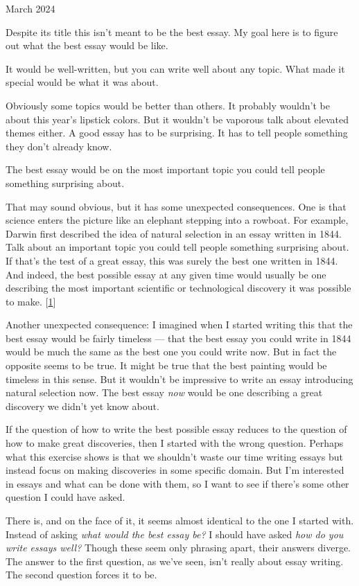 March 2024

Despite its title this isn't meant to be the best essay. My goal here is
to figure out what the best essay would be like.

It would be well-written, but you can write well about any topic. What
made it special would be what it was about.

Obviously some topics would be better than others. It probably wouldn't
be about this year's lipstick colors. But it wouldn't be vaporous talk
about elevated themes either. A good essay has to be surprising. It has
to tell people something they don't already know.

The best essay would be on the most important topic you could tell
people something surprising about.

That may sound obvious, but it has some unexpected consequences. One is
that science enters the picture like an elephant stepping into a
rowboat. For example, Darwin first described the idea of natural
selection in an essay written in 1844. Talk about an important topic you
could tell people something surprising about. If that's the test of a
great essay, this was surely the best one written in 1844. And indeed,
the best possible essay at any given time would usually be one
describing the most important scientific or technological discovery it
was possible to make. {[}\hyperref[f1n]{1}{]}

Another unexpected consequence: I imagined when I started writing this
that the best essay would be fairly timeless --- that the best essay you
could write in 1844 would be much the same as the best one you could
write now. But in fact the opposite seems to be true. It might be true
that the best painting would be timeless in this sense. But it wouldn't
be impressive to write an essay introducing natural selection now. The
best essay \emph{now} would be one describing a great discovery we
didn't yet know about.

If the question of how to write the best possible essay reduces to the
question of how to make great discoveries, then I started with the wrong
question. Perhaps what this exercise shows is that we shouldn't waste
our time writing essays but instead focus on making discoveries in some
specific domain. But I'm interested in essays and what can be done with
them, so I want to see if there's some other question I could have
asked.

There is, and on the face of it, it seems almost identical to the one I
started with. Instead of asking \emph{what would the best essay be?} I
should have asked \emph{how do you write essays well?} Though these seem
only phrasing apart, their answers diverge. The answer to the first
question, as we've seen, isn't really about essay writing. The second
question forces it to be.

